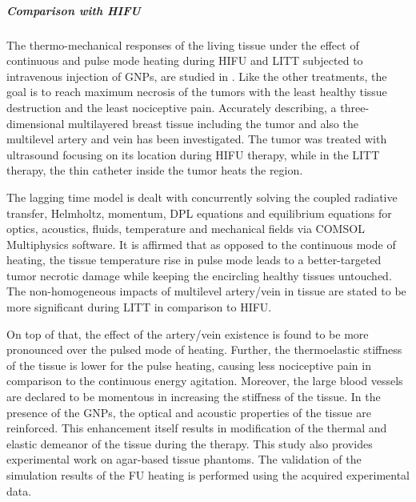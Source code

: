 \documentclass[sn-mathphys]{sn-jnl}%
\theoremstyle{thmstyleone}%
\theoremstyle{thmstyletwo}%
\theoremstyle{thmstylethree}%
\begin{document}
{%
\subparagraph{Comparison with HIFU}
The thermo-mechanical responses of the living tissue under the effect of continuous and pulse mode heating during HIFU and LITT subjected to intravenous injection of GNPs, are studied in \cite{Paul20202}. Like the other treatments, the goal is to reach maximum necrosis of the tumors with the least healthy tissue destruction and the least nociceptive pain. Accurately describing, a three-dimensional multilayered breast tissue including the tumor and also the multilevel artery and vein has been investigated. The tumor was treated with ultrasound focusing on its location during HIFU therapy, while in the LITT therapy, the thin catheter inside the tumor heats the region.

The lagging time model is dealt with concurrently solving the coupled radiative transfer, Helmholtz, momentum, DPL equations and equilibrium equations for optics, acoustics, fluids, temperature and mechanical fields via COMSOL Multiphysics software. It is affirmed that as opposed to the continuous mode of heating, the tissue temperature rise in pulse mode leads to a better-targeted tumor necrotic damage while keeping the encircling healthy tissues untouched. The non-homogeneous impacts of multilevel artery/vein in tissue are stated to be more significant during LITT in comparison to HIFU.

On top of that, the effect of the artery/vein existence is found to be more pronounced over the pulsed mode of heating. Further, the thermoelastic stiffness of the tissue is lower for the pulse heating, causing less nociceptive pain in comparison to the continuous energy agitation. Moreover, the large blood vessels are declared to be momentous in increasing the stiffness of the tissue. In the presence of the GNPs, the optical and acoustic properties of the tissue are reinforced. This enhancement itself results in modification of the thermal and elastic demeanor of the tissue during the therapy. This study also provides experimental work on agar-based tissue phantoms. The validation of the simulation results of the FU heating is performed using the acquired experimental data.

}
\end{document}
